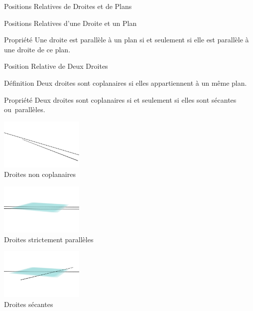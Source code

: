 \documentclass{cours}
\begin{document}
\begin{Gpartie}{Positions Relatives de Droites et de Plans}
\begin{Spartie}{Positions Relatives d'une Droite et un Plan}
\begin{center}
            \end{center}
            \begin{SSpartie}{Propriété} 
                Une droite est parallèle à un plan si et seulement si elle est parallèle à une droite de ce plan.
            \end{SSpartie}
        \end{Spartie}
        \begin{Spartie}{Position Relative de Deux Droites} 
            \begin{SSpartie}{Définition} 
                Deux droites sont coplanaires si elles appartiennent à un même plan.
            \end{SSpartie}
            \begin{SSpartie}{Propriété} 
                Deux droites sont coplanaires si et seulement si elles sont sécantes ou~parallèles.
                \begin{center}
                    \begin{minipage}{4cm}\includegraphics[width=4cm]{rsc/11fig6a.png}\\ \centering Droites non coplanaires\end{minipage}
                    \begin{minipage}{4cm}\includegraphics[width=4cm]{rsc/11fig6b.png}\\ \centering Droites strictement parallèles\end{minipage} 
                    \begin{minipage}{4cm}\includegraphics[width=4cm]{rsc/11fig6c.png}\\ \centering Droites sécantes\end{minipage}

\end{center}
\end{SSpartie}
\end{Spartie}
\end{Gpartie}
\end{document}
